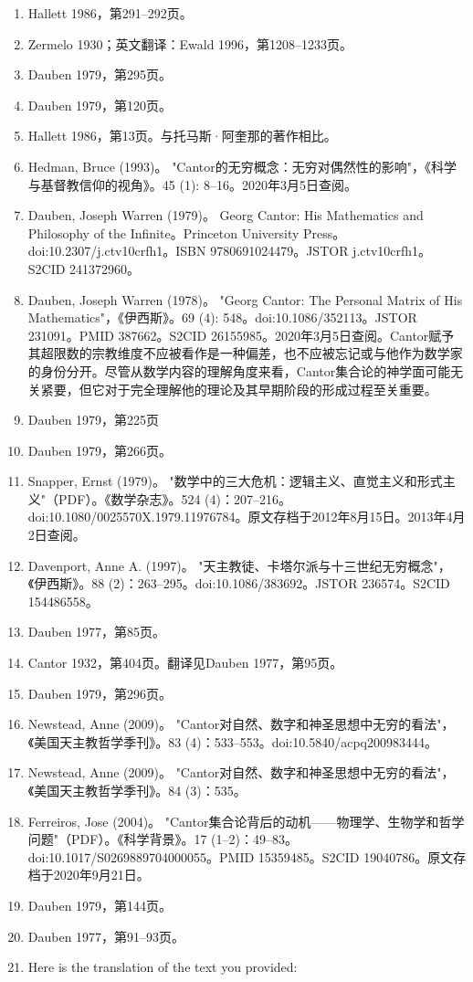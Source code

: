 \begin{enumerate}
\item Hallett 1986，第291–292页。
\item Zermelo 1930；英文翻译：Ewald 1996，第1208–1233页。
\item Dauben 1979，第295页。
\item Dauben 1979，第120页。
\item Hallett 1986，第13页。与托马斯·阿奎那的著作相比。
\item Hedman, Bruce (1993)。 "Cantor的无穷概念：无穷对偶然性的影响"，《科学与基督教信仰的视角》。45 (1): 8–16。2020年3月5日查阅。
\item Dauben, Joseph Warren (1979)。 Georg Cantor: His Mathematics and Philosophy of the Infinite。Princeton University Press。doi:10.2307/j.ctv10crfh1。ISBN 9780691024479。JSTOR j.ctv10crfh1。S2CID 241372960。
\item Dauben, Joseph Warren (1978)。 "Georg Cantor: The Personal Matrix of His Mathematics"，《伊西斯》。69 (4): 548。doi:10.1086/352113。JSTOR 231091。PMID 387662。S2CID 26155985。2020年3月5日查阅。Cantor赋予其超限数的宗教维度不应被看作是一种偏差，也不应被忘记或与他作为数学家的身份分开。尽管从数学内容的理解角度来看，Cantor集合论的神学面可能无关紧要，但它对于完全理解他的理论及其早期阶段的形成过程至关重要。
\item Dauben 1979，第225页
\item Dauben 1979，第266页。
\item Snapper, Ernst (1979)。 "数学中的三大危机：逻辑主义、直觉主义和形式主义"（PDF）。《数学杂志》。524 (4)：207–216。doi:10.1080/0025570X.1979.11976784。原文存档于2012年8月15日。2013年4月2日查阅。
\item Davenport, Anne A. (1997)。 "天主教徒、卡塔尔派与十三世纪无穷概念"，《伊西斯》。88 (2)：263–295。doi:10.1086/383692。JSTOR 236574。S2CID 154486558。
\item Dauben 1977，第85页。
\item Cantor 1932，第404页。翻译见Dauben 1977，第95页。
\item Dauben 1979，第296页。
\item Newstead, Anne (2009)。 "Cantor对自然、数字和神圣思想中无穷的看法"，《美国天主教哲学季刊》。83 (4)：533–553。doi:10.5840/acpq200983444。
\item Newstead, Anne (2009)。 "Cantor对自然、数字和神圣思想中无穷的看法"，《美国天主教哲学季刊》。84 (3)：535。
\item Ferreiros, Jose (2004)。 "Cantor集合论背后的动机——物理学、生物学和哲学问题"（PDF）。《科学背景》。17 (1–2)：49–83。doi:10.1017/S0269889704000055。PMID 15359485。S2CID 19040786。原文存档于2020年9月21日。
\item Dauben 1979，第144页。
\item Dauben 1977，第91–93页。
\item Here is the translation of the text you provided:


\end{enumerate}

